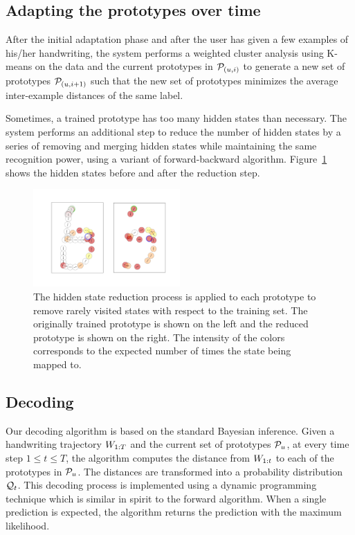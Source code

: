 \documentclass{sigchi}
\begin{document}
\subsection{Adapting the prototypes over time}

After the initial adaptation phase and after the user has given a few
examples of his/her handwriting, the system performs a weighted cluster
analysis using K-means on the data and the current prototypes in
$\mathcal{P}_{(u,i)}$ to generate a new set of prototypes
$\mathcal{P}_{(u,i+1)}$ such that the new set of prototypes minimizes the
average inter-example distances of the same label. 

Sometimes, a trained prototype has too many hidden states than
necessary. The system performs an additional step to reduce the number
of hidden states by a series of removing and merging hidden states
while maintaining the same recognition power, using a variant of
forward-backward algorithm. Figure~\ref{fig:state_reduction} shows the
hidden states before and after the reduction step.

\begin{figure}[h]
  \centering
  \includegraphics[width=0.5\textwidth] {figures/state_reduction.png}
  \caption{The hidden state reduction process is applied to each
    prototype to remove rarely visited states with respect to the
    training set. The originally trained prototype is shown on the
    left and the reduced prototype is shown on the right. The
    intensity of the colors corresponds to the expected number of
    times the state being mapped to. }
  \label{fig:state_reduction}
\end{figure}

\subsection{Decoding}

Our decoding algorithm is based on the standard Bayesian inference.
Given a handwriting trajectory $W_{1:{T}}$ and the current set of
prototypes $\mathcal{P}_u$, at every time step $1 \le t \le T$, the
algorithm computes the distance from $W_{1:{t}}$ to each of the
prototypes in $\mathcal{P}_u$. The distances are transformed into a
probability distribution $\mathcal{Q}_{t}$. This decoding process is
implemented using a dynamic programming technique which is similar in
spirit to the forward algorithm. When a single prediction is expected,
the algorithm returns the prediction with the maximum likelihood.
\end{document}
